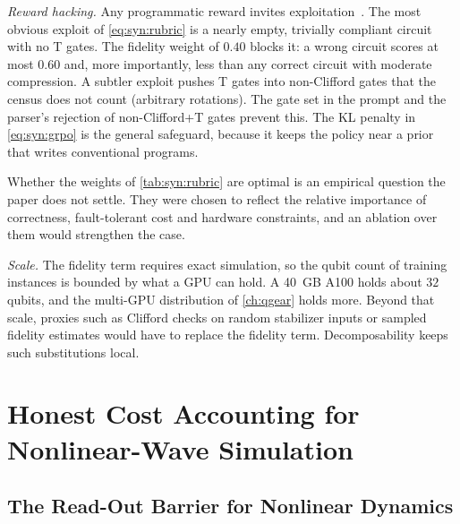 \emph{Reward hacking.} Any programmatic reward invites exploitation~\cite{skalse2022rewardhacking}. The most obvious exploit of \cref{eq:syn:rubric} is a nearly empty, trivially compliant circuit with no T gates. The fidelity weight of $0.40$ blocks it: a wrong circuit scores at most $0.60$ and, more importantly, less than any correct circuit with moderate compression. A subtler exploit pushes T gates into non-Clifford gates that the census does not count (arbitrary rotations). The gate set in the prompt and the parser's rejection of non-Clifford+T gates prevent this. The KL penalty in \cref{eq:syn:grpo} is the general safeguard, because it keeps the policy near a prior that writes conventional programs.

Whether the weights of \cref{tab:syn:rubric} are optimal is an empirical question the paper does not settle. They were chosen to reflect the relative importance of correctness, fault-tolerant cost and hardware constraints, and an ablation over them would strengthen the case.

\emph{Scale.} The fidelity term requires exact simulation, so the qubit count of training instances is bounded by what a GPU can hold. A 40~GB A100 holds about $32$ qubits, and the multi-GPU distribution of \cref{ch:qgear} holds more. Beyond that scale, proxies such as Clifford checks on random stabilizer inputs or sampled fidelity estimates would have to replace the fidelity term. Decomposability keeps such substitutions local.

\section{Honest Cost Accounting for Nonlinear-Wave Simulation}\label{sec:syn:waves}

\subsection{The Read-Out Barrier for Nonlinear Dynamics}\label{sec:syn:waves-problem}


